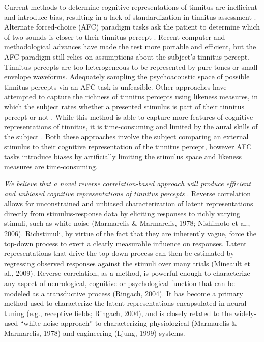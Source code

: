 \documentclass[11pt, notitlepage]{article} %
\begin{document}
Current methods to determine cognitive representations of tinnitus
are inefficient and introduce bias, resulting in a lack of standardization in tinnitus assessment \cite{henryTinnitusEpidemiologicPerspective2020}.
Alternate forced-choice (AFC) paradigm tasks ask the patient to determine which of two sounds
is closer to their tinnitus percept \cite{henryComparisonTwoComputerautomated2001,henryComputerautomatedTinnitusAssessment2004,henryComputerautomatedTinnitusAssessment2013,korthOneStepCloser2020}.
Recent computer and methodological advances have made the test more portable and efficient,
but the AFC paradigm still relies on assumptions about the subject's tinnitus percept.
Tinnitus percepts are too heterogeneous to be represented by pure tones or small-envelope waveforms.
Adequately sampling the psychoacoustic space of possible tinnitus percepts via an AFC task is unfeasible.
Other approaches have attempted to capture the richness of tinnitus percepts using likeness measures,
in which the subject rates whether a presented stimulus is part of their tinnitus percept or not \cite{norenaPsychoacousticCharacterizationTinnitus2002}.
While this method is able to capture more features of cognitive representations of tinnitus,
it is time-consuming and limited by the aural skills of the subject \cite{vajsakovicPrinciplesMethodsPsychoacoustic2021}.
Both these approaches involve the subject comparing an external stimulus to their cognitive representation of the tinnitus percept,
however AFC tasks introduce biases by artificially limiting the stimulus space and likeness measures are time-consuming.

\emph{We believe that a novel reverse correlation-based approach will produce efficient and unbiased cognitive representations of tinnitus percepts}
\cite{gosselinSuperstitiousPerceptionsReveal2003}.
Reverse correlation allows for unconstrained and unbiased
characterization of latent representations directly from stimulus-response data by eliciting responses to
richly varying stimuli, such as white noise (Marmarelis \& Marmarelis, 1978; Nishimoto et al., 2006). Richstimuli, by virtue of the fact that they are inherently vague, force the top-down process to exert a clearly
measurable influence on responses. Latent representations that drive the top-down process can then be
estimated by regressing observed responses against the stimuli over many trials (Mineault et al., 2009).
Reverse correlation, as a method, is powerful enough to characterize any aspect of neurological,
cognitive or psychological function that can be modeled as a transductive process (Ringach, 2004). It has
become a primary method used to characterize the latent representations encapsulated in neural tuning
(e.g., receptive fields; Ringach, 2004), and is closely related to the widely-used “white noise approach” to
characterizing physiological (Marmarelis \& Marmarelis, 1978) and engineering (Ljung, 1999) systems. 
\end{document}
